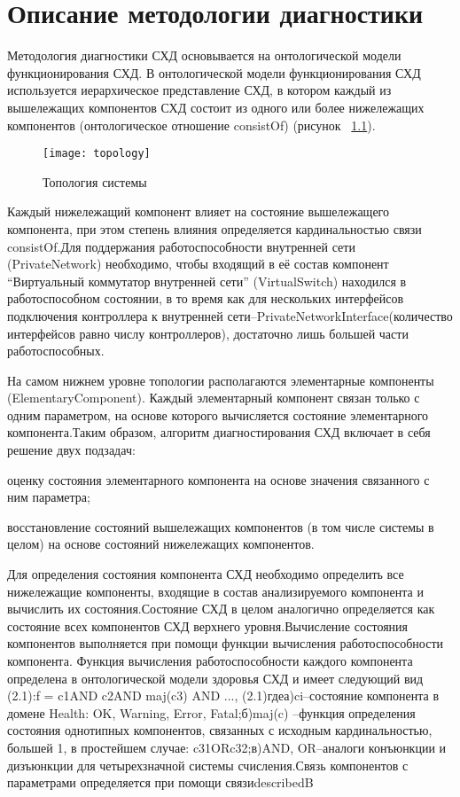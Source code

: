 \chapter{Описание методологии диагностики}
Методология диагностики СХД основывается на онтологической модели функционирования СХД.
В  онтологической  модели  функционирования СХД используется иерархическое представление СХД, в котором каждый из вышележащих компонентов СХД состоит из одного или более нижележащих компонентов (онтологическое отношение consistOf) (рисунок ~\ref{fig:topology}).
\begin{figure}[h]
	\centering
	\texttt{[image: topology]}
	\caption{Топология системы}
	\label{fig:topology}
\end{figure}

Каждый нижележащий компонент влияет на  состояние  вышележащего  компонента,  при  этом  степень  влияния определяется кардинальностью связи consistOf.Для поддержания работоспособности внутренней сети (PrivateNetwork) необходимо,  чтобы входящий  в  её  состав  компонент “Виртуальный коммутатор  внутренней  сети”  (VirtualSwitch)  находился  в  работоспособном состоянии,  в  то  время  как  для  нескольких  интерфейсов  подключения контроллера  к  внутренней  сети–PrivateNetworkInterface(количество интерфейсов  равно  числу  контроллеров),  достаточно  лишь  большей  части работоспособных.

На  самом  нижнем  уровне  топологии  располагаются  элементарные компоненты  (ElementaryComponent).  Каждый  элементарный  компонент связан  только  с  одним  параметром,  на  основе  которого вычисляется состояние элементарного компонента.Таким  образом,  алгоритм  диагностирования СХД включает  в  себя решение двух подзадач:
\begin{itemize*}
	\item{оценку состояния  элементарного  компонента  на  основе  значения связанного с ним параметра;}
	\item{восстановление состояний вышележащих компонентов (в том числе системы в целом) на основе состояний нижележащих компонентов.}
\end{itemize*}
Для определения состояния компонента СХД необходимо определить все  нижележащие  компоненты,  входящие  в  состав  анализируемого компонента и вычислить их состояния.Состояние СХД в целом аналогично определяется как состояние всех компонентов СХД верхнего уровня.Вычисление  состояния  компонентов  выполняется  при  помощи функции вычисления работоспособности компонента. Функция вычисления работоспособности  каждого  компонента  определена  в  онтологической модели здоровья СХД и имеет следующий вид (2.1):f = c1AND c2AND maj(c3) AND ..., (2.1)гдеа)ci–состояние компонента в домене Health: OK, Warning, Error, Fatal;б)maj(c) –функция определения состояния однотипных компонентов, связанных с исходным кардинальностью, большей 1, в простейшем случае: c31ORc32;в)AND, OR–аналоги конъюнкции и дизъюнкции для четырехзначной системы счисления.Связь  компонентов  с  параметрами  определяется  при  помощи  связиdescribedB